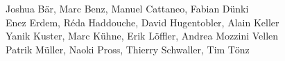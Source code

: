 %
%
%
Joshua Bär,			%
Marc Benz,			%
Manuel Cattaneo,		%
Fabian Dünki%
\\
Enez Erdem,			%
Réda Haddouche,			%
David Hugentobler,		%
Alain Keller%
\\
Yanik Kuster,			%
Marc Kühne,			%
Erik Löffler,			%
Andrea Mozzini Vellen%
\\
Patrik Müller,			%
Naoki Pross,			%
Thierry Schwaller,		%
Tim Tönz			%

